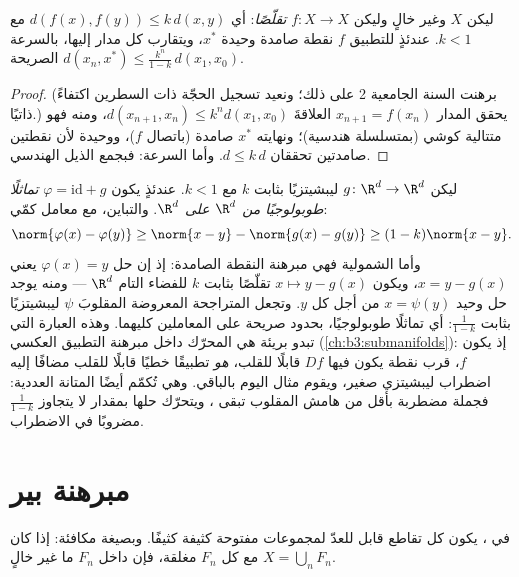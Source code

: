 \begin{theorem}\label{thm:b3:complete:banach}
ليكن $X$  وغير خالٍ وليكن $f \colon X \to X$ \emph{تقلّصًا}: أي $d(f(x), f(y)) \leq k\,d(x,y)$
مع $k < 1$. عندئذٍ للتطبيق $f$ نقطة صامدة وحيدة $x^*$، ويتقارب كل مدار
إليها، بالسرعة الصريحة $d(x_n, x^*) \leq
\frac{k^n}{1-k}\,d(x_1, x_0)$.
\end{theorem}

\begin{proof}
(برهنت السنة الجامعية 2 على ذلك؛ ونعيد تسجيل الحجّة ذات السطرين
اكتفاءً ذاتيًا.) يحقق المدار $x_{n+1} = f(x_n)$ العلاقةَ $d(x_{n+1},
x_n) \leq k^nd(x_1, x_0)$، ومنه فهو
متتالية كوشي (بمتسلسلة هندسية)؛ ونهايته $x^*$ صامدة (باتصال
$f$)، ووحيدة لأن نقطتين صامدتين تحققان $d \leq k\,d$. وأما
السرعة: فبجمع الذيل الهندسي.
\end{proof}

\begin{example}
\label{ex:b3:complete:perturbident}
ليكن $g \colon \R^d \to \R^d$ ليبشيتزيًا بثابت $k$ مع $k < 1$. عندئذٍ يكون $\varphi = \mathrm{id} + g$
\emph{تماثلًا طوبولوجيًا من $\R^d$ على $\R^d$}. والتباين، مع
معامل كمّي:
\[
\norm{\varphi(x) - \varphi(y)} \geq \norm{x - y} -
\norm{g(x) - g(y)} \geq (1 - k)\norm{x - y} .
\]
وأما الشمولية فهي مبرهنة النقطة الصامدة: إذ إن حل
$\varphi(x) = y$ يعني $x = y - g(x)$، ويكون $x \mapsto y -
g(x)$ تقلّصًا
بثابت $k$ للفضاء التام $\R^d$ --- ومنه يوجد حل وحيد
$x = \psi(y)$ من أجل كل $y$. وتجعل المتراجحة المعروضة المقلوبَ
$\psi$ ليبشيتزيًا بثابت $\frac1{1-k}$: أي تماثلًا طوبولوجيًا،
بحدود صريحة على المعاملين كليهما. وهذه العبارة التي تبدو
بريئة هي المحرّك داخل مبرهنة التطبيق العكسي (\cref{ch:b3:submanifolds}): إذ
يكون $f$، قرب نقطة يكون فيها $Df$ قابلًا للقلب، \emph{هو}
تطبيقًا خطيًا قابلًا للقلب مضافًا إليه اضطراب ليبشيتزي صغير،
ويقوم مثال اليوم بالباقي. وهي تُكمّم أيضًا المتانة العددية:
فجملة مضطربة بأقل من هامش المقلوب تبقى ، ويتحرّك
حلها بمقدار لا يتجاوز $\frac{1}{1-k}$ مضروبًا في الاضطراب.
\end{example}

\section{مبرهنة بير}

\begin{theorem}[بير]\label{thm:b3:complete:baire}
في ، يكون كل تقاطع قابل للعدّ لمجموعات مفتوحة كثيفة
كثيفًا. وبصيغة مكافئة: إذا كان $X = \bigcup_{n}F_n$ مع كل $F_n$ مغلقة، فإن
داخل $F_n$ ما غير خالٍ.
\end{theorem}

